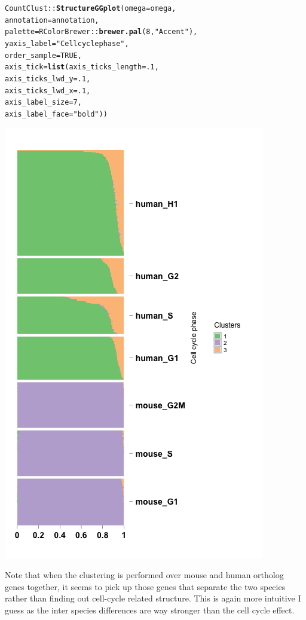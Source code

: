\documentclass[12pt]{article}\usepackage[]{graphicx}\usepackage[usenames,dvipsnames]{color}
\makeatletter
\newcommand{\hlnum}[1]{\textcolor[rgb]{0.686,0.059,0.569}{#1}}%
\newcommand{\hlstr}[1]{\textcolor[rgb]{0.192,0.494,0.8}{#1}}%
\newcommand{\hlopt}[1]{\textcolor[rgb]{0,0,0}{#1}}%
\newcommand{\hlstd}[1]{\textcolor[rgb]{0.345,0.345,0.345}{#1}}%
\newcommand{\hlkwc}[1]{\textcolor[rgb]{0.333,0.667,0.333}{#1}}%
\newcommand{\hlkwd}[1]{\textcolor[rgb]{0.737,0.353,0.396}{\textbf{#1}}}%
\newenvironment{kframe}{%
 \def\at@end@of@kframe{}%
 \ifinner\ifhmode%
  \def\at@end@of@kframe{\end{minipage}}%
  \begin{minipage}{\columnwidth}%
 \fi\fi%
 \def\FrameCommand##1{\hskip\@totalleftmargin \hskip-\fboxsep
 \colorbox{shadecolor}{##1}\hskip-\fboxsep
     \hskip-\linewidth \hskip-\@totalleftmargin \hskip\columnwidth}%
 \MakeFramed {\advance\hsize-\width
   \@totalleftmargin\z@ \linewidth\hsize
   \@setminipage}}%
 {\par\unskip\endMakeFramed%
 \at@end@of@kframe}
\newenvironment{knitrout}{}{} %
\makeatother
\begin{document}
\begin{knitrout}
\begin{kframe}
\begin{alltt}
\hlstd{CountClust}\hlopt{::}\hlkwd{StructureGGplot}\hlstd{(}\hlkwc{omega} \hlstd{= omega,}
                \hlkwc{annotation} \hlstd{= annotation,}
                \hlkwc{palette} \hlstd{= RColorBrewer}\hlopt{::}\hlkwd{brewer.pal}\hlstd{(}\hlnum{8}\hlstd{,} \hlstr{"Accent"}\hlstd{),}
                \hlkwc{yaxis_label} \hlstd{=} \hlstr{"Cell cycle phase"}\hlstd{,}
                \hlkwc{order_sample} \hlstd{=} \hlnum{TRUE}\hlstd{,}
                \hlkwc{axis_tick} \hlstd{=} \hlkwd{list}\hlstd{(}\hlkwc{axis_ticks_length} \hlstd{=} \hlnum{.1}\hlstd{,}
                                 \hlkwc{axis_ticks_lwd_y} \hlstd{=} \hlnum{.1}\hlstd{,}
                                 \hlkwc{axis_ticks_lwd_x} \hlstd{=} \hlnum{.1}\hlstd{,}
                                 \hlkwc{axis_label_size} \hlstd{=} \hlnum{7}\hlstd{,}
                                 \hlkwc{axis_label_face} \hlstd{=} \hlstr{"bold"}\hlstd{))}
\end{alltt}
\end{kframe}
\includegraphics[width=3 in,height=5 in]{figure/structure_ortholog_maptpx-1} 

\end{knitrout}

Note that when the clustering is performed over mouse and human ortholog genes together, it seems to pick up those genes that separate the two species rather than finding out cell-cycle related structure. This is again more intuitive I guess as the inter species differences are way stronger than the cell cycle effect. 
\end{document}
